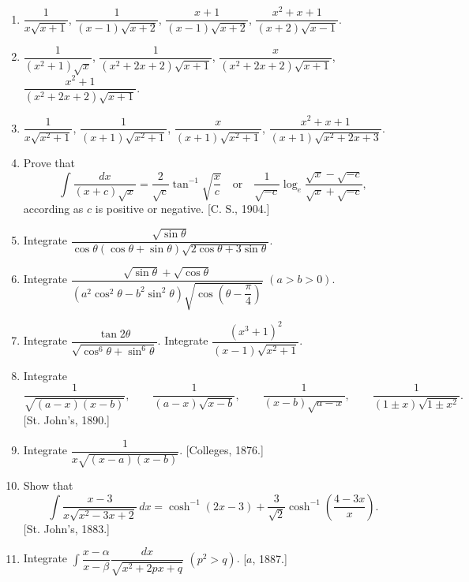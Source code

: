 \documentclass[11pt, a4paper]{article}
\newcommand{\source}[1]{\hfill\textnormal{[#1]}}
\begin{document}
\begin{enumerate}[leftmargin=2em]

\item $\dfrac{1}{x\sqrt{x+1}}$, $\dfrac{1}{(x-1)\sqrt{x+2}}$, $\dfrac{x+1}{(x-1)\sqrt{x+2}}$, $\dfrac{x^2+x+1}{(x+2)\sqrt{x-1}}$.

\item $\dfrac{1}{(x^2+1)\sqrt{x}}$, $\dfrac{1}{(x^2+2x+2)\sqrt{x+1}}$, $\dfrac{x}{(x^2+2x+2)\sqrt{x+1}}$, $\dfrac{x^2+1}{(x^2+2x+2)\sqrt{x+1}}$.

\item $\dfrac{1}{x\sqrt{x^2+1}}$, $\dfrac{1}{(x+1)\sqrt{x^2+1}}$, $\dfrac{x}{(x+1)\sqrt{x^2+1}}$, $\dfrac{x^2+x+1}{(x+1)\sqrt{x^2+2x+3}}$.

\item Prove that
\[
\int \dfrac{dx}{(x+c)\sqrt{x}}=\dfrac{2}{\sqrt{c}}\tan^{-1}\sqrt{\dfrac{x}{c}} \quad\text{or}\quad \dfrac{1}{\sqrt{-c}}\log_e\dfrac{\sqrt{x}-\sqrt{-c}}{\sqrt{x}+\sqrt{-c}},
\]
according as $c$ is positive or negative. \source{C. S., 1904.}

\item Integrate $\dfrac{\sqrt{\sin\theta}}{\cos\theta(\cos\theta+\sin\theta)\sqrt{2\cos\theta+3\sin\theta}}$.

\item Integrate $\dfrac{\sqrt{\sin\theta}+\sqrt{\cos\theta}}{(a^2\cos^2\theta-b^2\sin^2\theta)\sqrt{\cos\left(\theta-\dfrac{\pi}{4}\right)}}$ \quad $(a>b>0)$.

\item Integrate $\dfrac{\tan2\theta}{\sqrt{\cos^6\theta+\sin^6\theta}}$. \qquad Integrate $\dfrac{(x^3+1)^2}{(x-1)\sqrt{x^2+1}}$.

\item Integrate
\[
\dfrac{1}{\sqrt{(a-x)(x-b)}}, \qquad \dfrac{1}{(a-x)\sqrt{x-b}}, \qquad \dfrac{1}{(x-b)\sqrt{a-x}}, \qquad \dfrac{1}{(1\pm x)\sqrt{1\pm x^2}}.
\]
\source{St. John's, 1890.}

\item Integrate $\dfrac{1}{x\sqrt{(x-a)(x-b)}}$. \source{Colleges, 1876.}

\item Show that
\[
\int \dfrac{x-3}{x\sqrt{x^2-3x+2}}\,dx=\cosh^{-1}(2x-3)+\dfrac{3}{\sqrt2}\cosh^{-1}\left(\dfrac{4-3x}{x}\right).
\]
\source{St. John's, 1883.}

\item Integrate $\displaystyle\int \dfrac{x-\alpha}{x-\beta}\dfrac{dx}{\sqrt{x^2+2px+q}}$ \quad $(p^2>q)$. \source{$a$, 1887.}


\end{enumerate}
\end{document}
